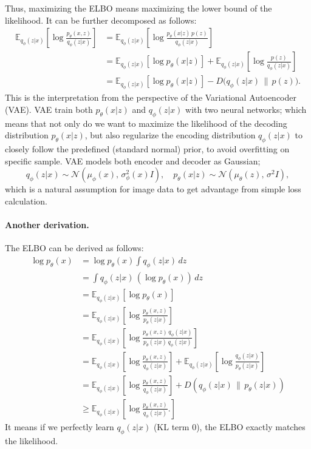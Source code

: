 Thus, maximizing the ELBO means maximizing the lower bound of the likelihood.   
It can be further decomposed as follows:
\[
\begin{aligned}
    \mathbb{E}_{q_\phi(z|x)} \left[ \log \frac{p_\theta(x, z)}{q_\phi(z|x)} \right]
    &= \mathbb{E}_{q_\phi(z|x)} \left[ \log \frac{p_\theta(x|z)\, p(z)}{q_\phi(z|x)} \right] \\
    &= \mathbb{E}_{q_\phi(z|x)} [\log p_\theta(x|z)]
    + \mathbb{E}_{q_\phi(z|x)} \left[ \log \frac{p(z)}{q_\phi(z|x)} \right] \\
    &= \mathbb{E}_{q_\phi(z|x)} [\log p_\theta(x|z)]
    - D\big(q_\phi(z|x)\,\|\,p(z)\big).
\end{aligned}
\]
This is the interpretation from the perspective of the Variational Autoencoder (VAE). VAE train both $p_{\theta}(x|z)$ and $q_{\phi}(z|x)$ with two neural networks; which means that not only do we want to maximize the likelihood of the decoding distribution $p_{\theta}(x|z)$, but also regularize the encoding distribution $q_{\phi}(z|x)$ to closely follow the predefined (standard normal) prior, to avoid overfitting on specific sample. VAE models both encoder and decoder as Gaussian; \[q_{\phi}(z|x)\sim\mathcal{N}(\mu_{\phi}(x),\,\sigma^2_{\phi}(x)I),\quad p_{\theta}(x|z)\sim\mathcal{N}(\mu_{\theta}(z),\,\sigma^2I),\]
which is a natural assumption for image data to get advantage from simple loss calculation.

\paragraph{Another derivation.}
The ELBO can be derived as follows:
\[
\begin{aligned}
    \log p_\theta(x) 
    &= \log p_\theta(x) \int q_\phi(z|x) \, dz \\
    &= \int q_\phi(z|x) \, (\log p_\theta(x)) \, dz \\
    &= \mathbb{E}_{q_\phi(z|x)} [\log p_\theta(x)] \\
    &= \mathbb{E}_{q_\phi(z|x)} \left[ \log \frac{p_\theta(x, z)}{p_\theta(z|x)} \right] \\
    &= \mathbb{E}_{q_\phi(z|x)} \left[ \log \frac{p_\theta(x, z)\, q_\phi(z|x)}{p_\theta(z|x)\, q_\phi(z|x)} \right] \\
    &= \mathbb{E}_{q_\phi(z|x)} \left[ \log \frac{p_\theta(x, z)}{q_\phi(z|x)} \right] 
     + \mathbb{E}_{q_\phi(z|x)} \left[ \log \frac{q_\phi(z|x)}{p_\theta(z|x)} \right] \\
    &= \mathbb{E}_{q_\phi(z|x)} \left[ \log \frac{p_\theta(x, z)}{q_\phi(z|x)} \right] 
     + D\left(q_\phi(z|x) \,\|\, p_\theta(z|x)\right) \\
    &\geq \mathbb{E}_{q_\phi(z|x)} \left[ \log \frac{p_\theta(x, z)}{q_\phi(z|x)}. \right]
\end{aligned}
\]
It means if we perfectly learn $q_{\phi}(z|x)$ (KL term $0$), the ELBO exactly matches the likelihood.

